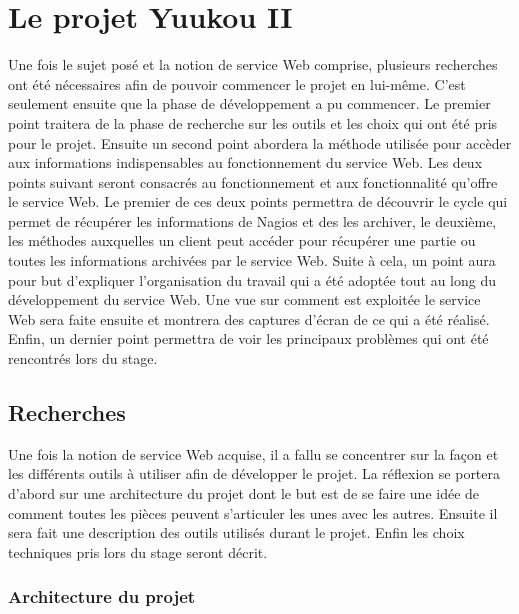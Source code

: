 \chapter{Le projet Yuukou II}

Une fois le sujet pos\'e et la notion de service Web comprise, plusieurs recherches ont \'et\'e n\'ecessaires afin de pouvoir commencer le projet en lui-m\^eme.
C'est seulement ensuite que la phase de d\'eveloppement a pu commencer.
Le premier point traitera de la phase de recherche sur les outils et les choix qui ont \'et\'e pris pour le projet.
Ensuite un second point abordera la m\'ethode utilis\'ee pour acc\`eder aux informations indispensables au fonctionnement du service Web.
Les deux points suivant seront consacr\'es au fonctionnement et aux fonctionnalit\'e qu'offre le service Web.
Le premier de ces deux points permettra de d\'ecouvrir le cycle qui permet de r\'ecup\'erer les informations de Nagios et des les archiver, le deuxi\`eme, les m\'ethodes auxquelles un client peut acc\'eder pour r\'ecup\'erer une partie ou toutes les informations archiv\'ees par le service Web.
Suite \`a cela, un point aura pour but d'expliquer l'organisation du travail qui a \'et\'e adopt\'ee tout au long du d\'eveloppement du service Web.
Une vue sur comment est exploit\'ee le service Web sera faite ensuite et montrera des captures d'\'ecran de ce qui a \'et\'e r\'ealis\'e.
Enfin, un dernier point permettra de voir les principaux probl\`emes qui ont \'et\'e rencontr\'es lors du stage.

\section{Recherches}

Une fois la notion de service Web acquise, il a fallu se concentrer sur la fa\c{c}on et les diff\'erents outils \`a utiliser afin de d\'evelopper le projet.
La r\'eflexion se portera d'abord sur une architecture du projet dont le but est de se faire une id\'ee de comment toutes les pi\`eces peuvent s'articuler les unes avec les autres.
Ensuite il sera fait une description des outils utilis\'es durant le projet.
Enfin les choix techniques pris lors du stage seront d\'ecrit.

\subsection{Architecture du projet}
\label{section:architectureProjet}

